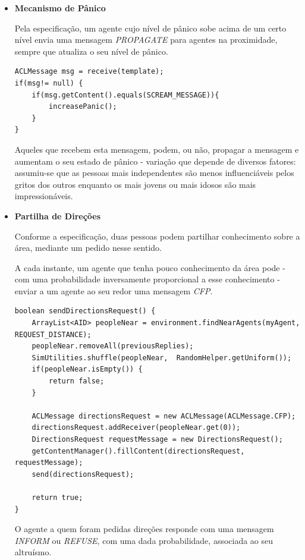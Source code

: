 \documentclass[12pt]{article}
\begin{document}
\begin{titlepage}
\begin{itemize}
\item \textbf{Mecanismo de Pânico}

Pela especificação, um agente cujo nível de pânico sobe acima de um certo nível envia uma mensagem \textit{PROPAGATE} para agentes na proximidade, sempre que atualiza o seu nível de pânico.

\begin{lstlisting}[caption= Código \textit{Java}\ responsável pelo envio de um grito.]
ACLMessage msg = receive(template);
if(msg!= null) {
	if(msg.getContent().equals(SCREAM_MESSAGE)){
		increasePanic();
	}
}
\end{lstlisting}

Aqueles que recebem esta mensagem, podem, ou não, propagar a mensagem e aumentam o seu estado de pânico - variação que depende de diversos fatores: assumiu-se que as pessoas mais independentes são menos influenciáveis pelos gritos dos outros enquanto os mais jovens ou mais idosos são mais impressionáveis.\newline


\item \textbf{Partilha de Direções}

Conforme a especificação, duas pessoas podem partilhar conhecimento sobre a área, mediante um pedido nesse sentido. 

A cada instante, um agente que tenha pouco conhecimento da área pode - com uma probabilidade inversamente proporcional a esse conhecimento - enviar a um agente ao seu redor uma mensagem \textit{CFP}.

\begin{lstlisting}[caption= Código \textit{Java}\ da função responsável pelo envio de um pedido de direções.]
boolean sendDirectionsRequest() {
	ArrayList<AID> peopleNear = environment.findNearAgents(myAgent, REQUEST_DISTANCE);
	peopleNear.removeAll(previousReplies);
	SimUtilities.shuffle(peopleNear,  RandomHelper.getUniform());
	if(peopleNear.isEmpty()) {
		return false;
	}
	
	ACLMessage directionsRequest = new ACLMessage(ACLMessage.CFP);			
	directionsRequest.addReceiver(peopleNear.get(0));
	DirectionsRequest requestMessage = new DirectionsRequest();
	getContentManager().fillContent(directionsRequest, requestMessage);
	send(directionsRequest);
	
	return true;
}
\end{lstlisting}

O agente a quem foram pedidas direções responde com uma mensagem \textit{INFORM} ou \textit{REFUSE}, com uma dada probabilidade, associada ao seu altruísmo.


\end{itemize}
\end{titlepage}
\end{document}
